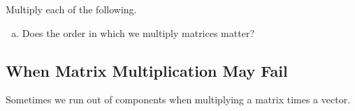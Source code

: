 \documentclass{article}
\begin{document}
\vfill 

\newpage

\begin{example}
Multiply each of the following.
\begin{enumerate}[(a)]
\vspace{5in}
    
    \item Does the order in which we multiply matrices matter?
    \vspace{1in} 
\end{enumerate}
\end{example}

\newpage 

\subsection*{When Matrix Multiplication May Fail}

Sometimes we run out of components when multiplying a matrix times a vector. \newline\\
\end{document}

